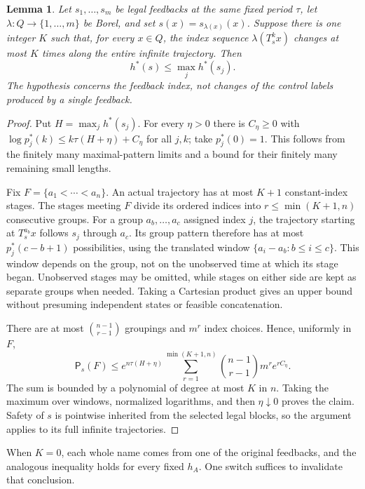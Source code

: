 \documentclass[11pt,reqno]{amsart}
\numberwithin{equation}{section}
\newtheorem{lemma}[theorem]{Lemma}
\theoremstyle{definition}
\theoremstyle{definition}
\newcommand{\Patt}{\mathsf P}
\begin{document}
\begin{lemma}\label{lem:finite-switch}
Let $s_1,\ldots,s_m$ be legal feedbacks at the same fixed period
$\tau$, let $\lambda:Q\to\{1,\ldots,m\}$ be Borel, and set
$s(x)=s_{\lambda(x)}(x)$. Suppose there is one integer $K$
such that, for every $x\in Q$, the index sequence
$\lambda(T_s^kx)$ changes at most $K$ times along the entire
infinite trajectory. Then
\[
 h^*(s)\le\max_j h^*(s_j).
\]
The hypothesis concerns the feedback index, not changes of
the control labels produced by a single feedback.
\end{lemma}
\begin{proof}
Put $H=\max_jh^*(s_j)$. For every $\eta>0$ there is
$C_\eta\ge0$ with
$\log p_j^*(k)\le k\tau(H+\eta)+C_\eta$ for all $j,k$;
take $p_j^*(0)=1$. This follows from the finitely many
maximal-pattern limits and a bound for their finitely many
remaining small lengths.

Fix $F=\{a_1<\cdots<a_n\}$. An actual trajectory has at
most $K+1$ constant-index stages. The stages meeting $F$
divide its ordered indices into $r\le\min(K+1,n)$ consecutive
groups. For a group $a_b,\ldots,a_c$ assigned index $j$,
the trajectory starting at $T_s^{a_b}x$ follows $s_j$ through
$a_c$. Its group pattern therefore has at most
$p_j^*(c-b+1)$ possibilities, using the translated window
$\{a_i-a_b:b\le i\le c\}$. This window depends on the
group, not on the unobserved time at which its stage began.
Unobserved stages may be omitted, while stages on either side
are kept as separate groups when needed. Taking a Cartesian
product gives an upper bound without presuming independent
states or feasible concatenation.

There are at most $\binom{n-1}{r-1}$ groupings and $m^r$
index choices. Hence, uniformly in $F$,
\[
 \Patt_s(F)\le e^{n\tau(H+\eta)}
 \sum_{r=1}^{\min(K+1,n)}
       \binom{n-1}{r-1}m^re^{rC_\eta}.
\]
The sum is bounded by a polynomial of degree at most $K$ in
$n$. Taking the maximum over windows, normalized logarithms,
and then $\eta\downarrow0$ proves the claim. Safety of $s$
is pointwise inherited from the selected legal blocks, so the
argument applies to its full infinite trajectories.
\end{proof}

When $K=0$, each whole name comes from one of the original
feedbacks, and the analogous inequality holds for every fixed
$h_A$. One switch suffices to invalidate that conclusion.
\end{document}
